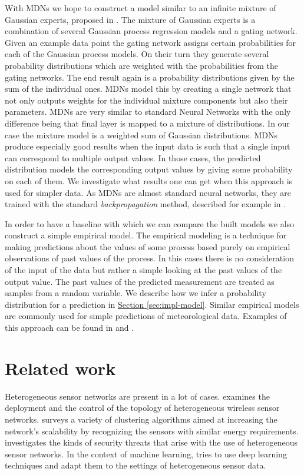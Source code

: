 \documentclass[12pt,a4paper,twoside]{scrartcl}
\numberwithin{equation}{section}
\newcommand{\refsec}[1]{\hyperref[#1]{Section \ref*{#1}}}
\begin{document}
With MDNs we hope to construct a model similar to an infinite mixture of Gaussian experts, proposed in \cite{rasmussen2002}. The mixture of Gaussian experts is a combination of several Gaussian process regression models and a gating network. Given an example data point the gating network assigns certain probabilities for each of the Gaussian process models. On their turn they generate several probability distributions which are weighted with the probabilities from the gating networks. The end result again is a probability distributions given by the sum of the individual ones. MDNs model this by creating a single network that not only outputs weights for the individual mixture components but also their parameters. MDNs are very similar to standard Neural Networks with the only difference being that final layer is mapped to a mixture of distributions. In our case the mixture model is a weighted sum of Gaussian distributions. MDNs produce especially good results when the input data is such that a single input can correspond to multiple output values. In those cases, the predicted distribution models the corresponding output values by giving some probability on each of them. We investigate what results one can get when this approach is used for simpler data. As MDNs are almost standard neural networks, they are trained with the standard \emph{backpropagation} method, described for example in \cite{bertels2001}.

In order to have a baseline with which we can compare the built models we also construct a simple empirical model. The empirical modeling is a technique for making predictions about the values of some process based purely on empirical observations of past values of the process. In this cases there is no consideration of the input of the data but rather a simple looking at the past values of the output value. The past values of the predicted measurement are treated as samples from a random variable. We describe how we infer a probability distribution for a prediction in \refsec{sec:impl-model}. Similar empirical models are commonly used for simple predictions of meteorological data. Examples of this approach can be found in \cite{krueger2011} and \cite{eden2015}.
\section{Related work}\label{sec:related-work}
Heterogeneous sensor networks are present in a lot of cases. \cite{wu2007} examines the deployment and the control of the topology of heterogeneous wireless sensor networks. \cite{katiyar2010} surveys a variety of clustering algorithms aimed at increasing the network's scalability by recognizing the sensors with similar energy requirements. \cite{uplap2014} investigates the kinds of security threats that arise with the use of heterogeneous sensor networks. In the context of machine learning,  \cite{liu2017} tries to use deep learning techniques and adapt them to the settings of heterogeneous sensor data.
\end{document}
